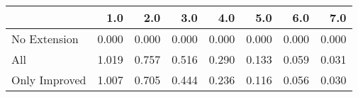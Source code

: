 \begin{tabular}{lrrrrrrr}
\toprule
{} &   1.0 &   2.0 &   3.0 &   4.0 &   5.0 &   6.0 &   7.0 \\
\midrule
No Extension  & 0.000 & 0.000 & 0.000 & 0.000 & 0.000 & 0.000 & 0.000 \\
All           & 1.019 & 0.757 & 0.516 & 0.290 & 0.133 & 0.059 & 0.031 \\
Only Improved & 1.007 & 0.705 & 0.444 & 0.236 & 0.116 & 0.056 & 0.030 \\
\bottomrule
\end{tabular}
